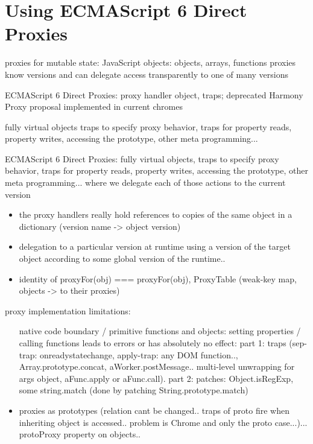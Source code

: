 \section{Using ECMAScript 6 Direct Proxies}

proxies for mutable state: JavaScript objects: objects, arrays, functions
proxies know versions and can delegate access transparently to one of many versions

ECMAScript 6 Direct Proxies: proxy handler object,
traps;
deprecated Harmony Proxy proposal implemented in current chromes

fully virtual objects traps to specify proxy behavior, traps for property reads, property writes, accessing the prototype, other meta programming...



ECMAScript 6 Direct Proxies: fully virtual objects, traps to specify proxy behavior, traps for property reads, property writes, accessing the prototype, other meta programming... where we delegate each of those actions to the current version


\begin{itemize}
    \item the proxy handlers really hold references to copies of the same object in a dictionary (version name -> object version)
    \item delegation to a particular version at runtime using a version of the target object according to some global version of the runtime..
    \item identity of proxyFor(obj) === proxyFor(obj), ProxyTable (weak-key map, objects -> to their proxies)
\end{itemize}



proxy implementation limitations: 
\begin{itemize}
    \item [native code] boundary / primitive functions and objects: setting properties / calling functions leads to errors or has absolutely no effect: part 1: traps (sep-trap: onreadystatechange, apply-trap: any DOM function.., Array.prototype.concat, aWorker.postMessage.. multi-level unwrapping for args object, aFunc.apply or aFunc.call).
part 2: patches: Object.isRegExp, some string.match (done by patching String.prototype.match)
    \item proxies as prototypes (relation cant be changed.. traps of proto fire when inheriting object is accessed.. problem is Chrome and only the proto case...)... protoProxy property on objects..
\end{itemize}


